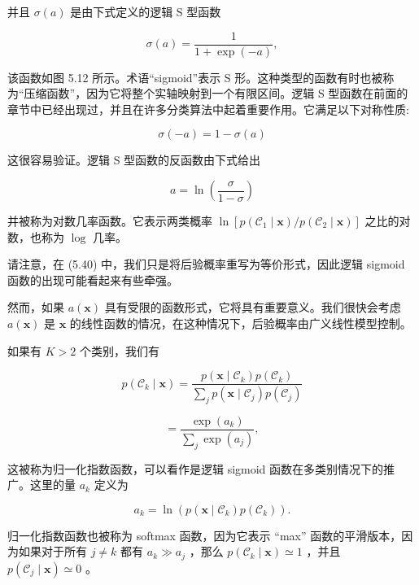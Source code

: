 \documentclass[10pt]{article}
\begin{document}
并且 \(\sigma \left( a\right)\) 是由下式定义的逻辑 S 型函数

\[
\sigma \left( a\right)  = \frac{1}{1 + \exp \left( {-a}\right) }, \tag{5.42}
\]

该函数如图 5.12 所示。术语“sigmoid”表示 S 形。这种类型的函数有时也被称为“压缩函数”，因为它将整个实轴映射到一个有限区间。逻辑 S 型函数在前面的章节中已经出现过，并且在许多分类算法中起着重要作用。它满足以下对称性质:

\[
\sigma \left( {-a}\right)  = 1 - \sigma \left( a\right)  \tag{5.43}
\]

这很容易验证。逻辑 S 型函数的反函数由下式给出

\[
a = \ln \left( \frac{\sigma }{1 - \sigma }\right)  \tag{5.44}
\]

并被称为对数几率函数。它表示两类概率 \(\ln \left\lbrack  {p\left( {{\mathcal{C}}_{1} \mid  \mathbf{x}}\right) /p\left( {{\mathcal{C}}_{2} \mid  \mathbf{x}}\right) }\right\rbrack\) 之比的对数，也称为 \(\log\) 几率。

请注意，在 (5.40) 中，我们只是将后验概率重写为等价形式，因此逻辑 sigmoid 函数的出现可能看起来有些牵强。

然而，如果 \(a\left( \mathbf{x}\right)\) 具有受限的函数形式，它将具有重要意义。我们很快会考虑 \(a\left( \mathbf{x}\right)\) 是 \(\mathbf{x}\) 的线性函数的情况，在这种情况下，后验概率由广义线性模型控制。

如果有 \(K > 2\) 个类别，我们有

\[
p\left( {{\mathcal{C}}_{k} \mid  \mathbf{x}}\right)  = \frac{p\left( {\mathbf{x} \mid  {\mathcal{C}}_{k}}\right) p\left( {\mathcal{C}}_{k}\right) }{\mathop{\sum }\limits_{j}p\left( {\mathbf{x} \mid  {\mathcal{C}}_{j}}\right) p\left( {\mathcal{C}}_{j}\right) }
\]

\[
= \frac{\exp \left( {a}_{k}\right) }{\mathop{\sum }\limits_{j}\exp \left( {a}_{j}\right) }, \tag{5.45}
\]

这被称为归一化指数函数，可以看作是逻辑 sigmoid 函数在多类别情况下的推广。这里的量 \({a}_{k}\) 定义为

\[
{a}_{k} = \ln \left( {p\left( {\mathbf{x} \mid  {\mathcal{C}}_{k}}\right) p\left( {\mathcal{C}}_{k}\right) }\right) . \tag{5.46}
\]

归一化指数函数也被称为 softmax 函数，因为它表示 “max” 函数的平滑版本，因为如果对于所有 \(j \neq  k\) 都有 \({a}_{k} \gg  {a}_{j}\) ，那么 \(p\left( {{\mathcal{C}}_{k} \mid  \mathbf{x}}\right)  \simeq  1\) ，并且 \(p\left( {{\mathcal{C}}_{j} \mid  \mathbf{x}}\right)  \simeq  0\) 。
\end{document}
